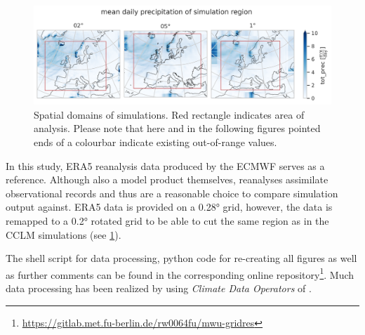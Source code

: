 \begin{figure}[h]
	\centering
	\includegraphics[width=\figwidth]{../figs/1-regionbox.png}
	\caption{Spatial domains of simulations. Red rectangle indicates area of analysis. Please note that here and in the following figures pointed ends of a colourbar indicate existing out-of-range values.}
	\label{fig:regionbox}
\end{figure}
	
In this study, ERA5 reanalysis data produced by the ECMWF serves as a reference. Although also a model product themselves, reanalyses assimilate observational records and thus are a reasonable choice to compare simulation output against. ERA5 data is provided on a 0.28° grid, however, the data is remapped to a 0.2° rotated grid to be able to cut the same region as in the CCLM simulations (see \cref{fig:regionbox}).

The shell script for data processing, python code for re-creating all figures as well as further comments can be found in the corresponding online repository\footnote{\url{https://gitlab.met.fu-berlin.de/rw0064fu/mwu-gridres}}. Much data processing has been realized by using \textit{Climate Data Operators} of \textcite{schulzweida2022}. 